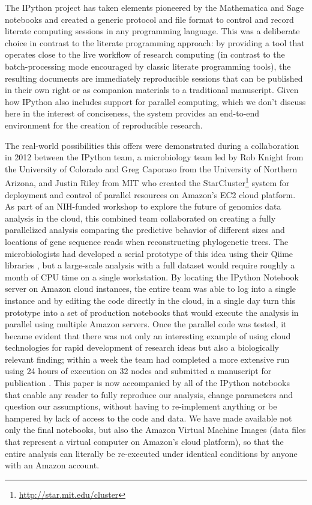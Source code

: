 \documentclass[11pt,oneside,english]{article}
\begin{document}
The IPython project has taken elements pioneered by the Mathematica and Sage
notebooks and created a generic protocol and file format to control and record
literate computing sessions in any programming language.  This was a deliberate
choice in contrast to the literate programming approach: by providing a tool
that operates close to the live workflow of research computing (in contrast to
the batch-processing mode encouraged by classic literate programming tools),
the resulting documents are immediately reproducible sessions that can be
published in their own right or as companion materials to a traditional
manuscript.  Given how IPython also includes support for parallel computing,
which we don't discuss here in the interest of conciseness, the system provides
an end-to-end environment for the creation of reproducible research.

The real-world possibilities this offers were demonstrated during a
collaboration in 2012 between the IPython team, a microbiology team led by Rob
Knight from the University of Colorado and Greg Caporaso from the University of
Northern Arizona, and Justin Riley from MIT who created the
StarCluster\footnote{\url{http://star.mit.edu/cluster}} system for deployment
and control of parallel resources on Amazon's EC2 cloud platform.  As part of
an NIH-funded workshop to explore the future of genomics data analysis in the
cloud, this combined team collaborated on creating a fully parallelized
analysis comparing the predictive behavior of different sizes and locations of
gene sequence reads when reconstructing phylogenetic trees.  The
microbiologists had developed a serial prototype of this idea using their Qiime
libraries \cite{caporaso2010qiime}, but a large-scale analysis with a full
dataset would require roughly a month of CPU time on a single workstation.  By
locating the IPython Notebook server on Amazon cloud instances, the entire team
was able to log into a single instance and by editing the code directly in the
cloud, in a single day turn this prototype into a set of production notebooks
that would execute the analysis in parallel using multiple Amazon servers.
Once the parallel code was tested, it became evident that there was not only an
interesting example of using cloud technologies for rapid development of
research ideas but also a biologically relevant finding; within a week the team
had completed a more extensive run using 24 hours of execution on 32 nodes and
submitted a manuscript for publication \cite{RWM+12}.  This paper is now
accompanied by all of the IPython notebooks that enable any reader to fully
reproduce our analysis, change parameters and question our assumptions, without
having to re-implement anything or be hampered by lack of access to the code
and data.  We have made available not only the final notebooks, but also the
Amazon Virtual Machine Images (data files that represent a virtual computer on
Amazon's cloud platform), so that the entire analysis can literally be
re-executed under identical conditions by anyone with an Amazon account.
\end{document}
